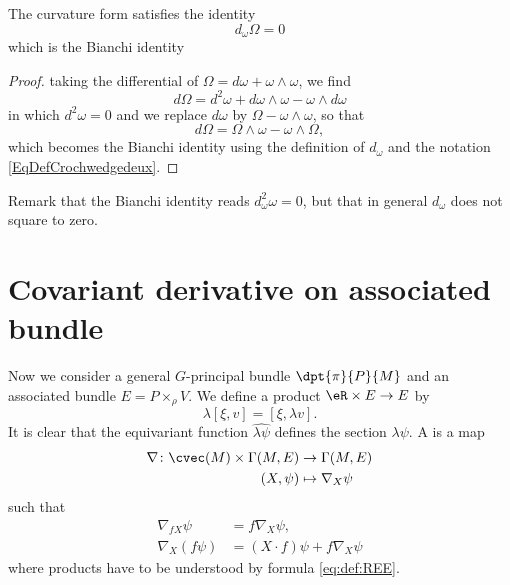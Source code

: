 \begin{proposition}
The curvature form satisfies the identity
\begin{equation}
d_{\omega}\Omega=0
\end{equation}
which is the Bianchi identity
\end{proposition}

\begin{proof}
taking the differential of $\Omega=d\omega+\omega\wedge\omega$, we find
\[
  d\Omega=d^2\omega+d\omega\wedge\omega-\omega\wedge d\omega
\]
in which $d^2\omega=0$ and we replace $d\omega$ by $\Omega-\omega\wedge\omega$, so that
\[
  d\Omega=\Omega\wedge\omega-\omega\wedge\Omega,
\]
which becomes the Bianchi identity using the definition of $d_{\omega}$ and the notation \eqref{EqDefCrochwedgedeux}.
\end{proof}
Remark that the Bianchi identity reads $d_{\omega}^2\omega=0$, but that in general $d_{\omega}$ does not square to zero.

\section{Covariant derivative on associated bundle}

Now we consider a general $G$-principal bundle $\dpt{\pi}{P}{M}$ and an associated bundle $E=P\times_{\rho} V$. We define a product $\eR\times E\to E$ by
\begin{equation}\label{eq:def:REE}
  \lambda[\xi,v]=[\xi,\lambda v].
\end{equation}
It is clear that the equivariant function $\widehat{\lambda \psi}$ defines the section $\lambda\psi$. A  is a map
		\begin{equation}
		\begin{aligned}
			\nabla \colon \cvec(M)\times \Gamma(M,E) &\to \Gamma(M,E)\\
			(X,\psi)&\mapsto \nabla_X\psi
		\end{aligned}
	\end{equation}
such that
\begin{subequations}
\begin{align}
\nabla_{fX}\psi&=f\nabla_X\psi,   \\
\nabla_X(f\psi)&=(X\cdot f)\psi+f\nabla_X\psi                                      \label{eq:def:der_covii}
\end{align}
\end{subequations}
where products have to be understood by formula \eqref{eq:def:REE}.

